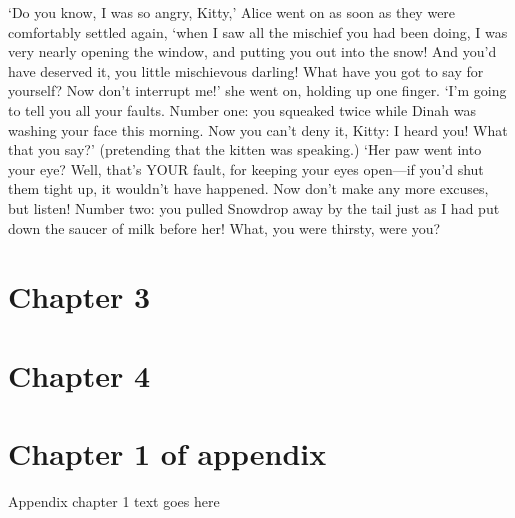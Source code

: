 \documentclass[phd,tocprelim]{cornell}
\begin{document}
  `Do you know, I was so angry, Kitty,' Alice went on as soon as
they were comfortably settled again, `when I saw all the mischief
you had been doing, I was very nearly opening the window, and
putting you out into the snow!  And you'd have deserved it, you
little mischievous darling!  What have you got to say for
yourself?  Now don't interrupt me!' she went on, holding up one
finger.  `I'm going to tell you all your faults.  Number one:
you squeaked twice while Dinah was washing your face this
morning.  Now you can't deny it, Kitty:  I heard you!  What that
you say?' (pretending that the kitten was speaking.)  `Her paw
went into your eye?  Well, that's YOUR fault, for keeping your
eyes open---if you'd shut them tight up, it wouldn't have
happened.  Now don't make any more excuses, but listen!  Number
two:  you pulled Snowdrop away by the tail just as I had put down
the saucer of milk before her!  What, you were thirsty, were you?

\chapter{Chapter 3}

\chapter{Chapter 4}

\appendix
\chapter{Chapter 1 of appendix}
Appendix chapter 1 text goes here


\end{document}
